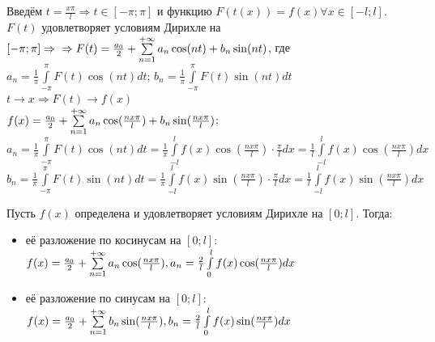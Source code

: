 \begin{Proof}
	Введём $t = \frac{x\pi}{l} \Rightarrow t \in [-\pi;\pi]$ и функцию $F(t(x)) = f(x) \forall x \in [-l;l]$. $F(t)$ удовлетворяет условиям Дирихле на $[-\pi;\pi] \Rightarrow\\
	\Rightarrow F(t) = \frac{a_0}{2} + \sum\limits_{n = 1}^{+\infty}{a_n\cos(nt) + b_n\sin(nt)}$, где $a_n = \frac{1}{\pi}\int\limits_{-\pi}^{\pi}F(t)\cos(nt) dt$; $b_n = \frac{1}{\pi}\int\limits_{-\pi}^{\pi}F(t)\sin(nt) dt$\\
	$t \rightarrow x \Rightarrow F(t) \rightarrow f(x)$\\
	$f(x) = \frac{a_0}{2} + \sum\limits_{n = 1}^{+\infty}{a_n\cos(\frac{nx\pi}{l}) + b_n\sin(\frac{nx\pi}{l})}$;\\
	$a_n = \frac{1}{\pi}\int\limits_{-\pi}^{\pi}F(t)\cos(nt)dt = \frac{1}{\pi}\int\limits_{-l}^{l}f(x)\cos(\frac{nx\pi}{l})\cdot \frac{\pi}{l}dx = \frac{1}{l}\int\limits_{-l}^{l}f(x)\cos(\frac{nx\pi}{l})dx$\\
	$b_n = \frac{1}{\pi}\int\limits_{-\pi}^{\pi}F(t)\sin(nt)dt = \frac{1}{\pi}\int\limits_{-l}^{l}f(x)\sin(\frac{nx\pi}{l})\cdot \frac{\pi}{l}dx = \frac{1}{l}\int\limits_{-l}^{l}f(x)\sin(\frac{nx\pi}{l})dx$
\end{Proof}

\begin{Note}
	Пусть $f(x)$ определена и удовлетворяет условиям Дирихле на $[0;l]$. Тогда:
	\begin{itemize}
		\item её разложение по косинусам на $[0;l]$: $f(x) = \frac{a_0}{2} + \sum\limits_{n = 1}^{+\infty}{a_n\cos(\frac{nx\pi}{l})}, a_n = \frac{2}{l} \int\limits_{0}^{l}f(x)\cos(\frac{nx\pi}{l})dx$
		\item её разложение по синусам на $[0;l]$: $f(x) = \frac{a_0}{2} + \sum\limits_{n = 1}^{+\infty}{b_n\sin(\frac{nx\pi}{l})}, b_n = \frac{2}{l} \int\limits_{0}^{l}f(x)\sin(\frac{nx\pi}{l})dx$
	\end{itemize}
\end{Note}